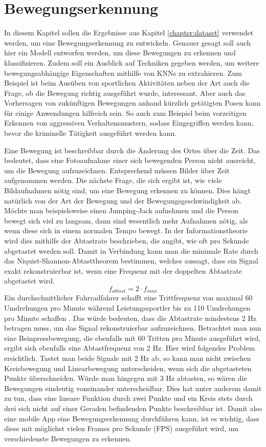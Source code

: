 \chapter{Bewegungserkennung}\label{chapter:motion-detection}
In diesem Kapitel sollen die Ergebnisse aus Kapitel \ref{chapter:dataset}
verwendet werden, um eine Bewegungserkennung zu entwickeln. Genauer gesagt soll
auch hier ein Modell entworfen werden, um diese Bewegungen zu erkennen und
klassifizieren. Zudem soll ein Ausblick auf Techniken gegeben werden, um weitere
bewegungsabhängige Eigenschaften mithilfe von KNNs zu extrahieren. Zum Beispiel
ist beim Ausüben von sportlichen Aktivitäten neben der Art auch die Frage, ob
die Bewegung richtig ausgeführt wurde, interessant. Aber auch das Vorhersagen
von zukünftigen Bewegungen anhand kürzlich getätigten Posen kann für einige
Anwendungen hilfreich sein. So auch zum Beispiel beim vorzeitigen Erkennen von
aggressiven Verhaltensmustern, sodass Eingegriffen werden kann, bevor die
kriminelle Tätigkeit ausgeführt werden kann. 

Eine Bewegung ist beschreibbar durch die Änderung des Ortes über die Zeit. Das
bedeutet, dass eine Fotoaufnahme einer sich bewegenden Person nicht ausreicht,
um die Bewegung aufzuzeichnen. Entsprechend müssen Bilder über Zeit aufgenommen
werden. Die nächste Frage, die sich ergibt ist, wie viele Bildaufnahmen nötig
sind, um eine Bewegung erkennen zu können. Dies hängt natürlich von der Art der
Bewegung und der Bewegungsgeschwindigkeit ab. Möchte man beispielsweise einen
Jumping-Jack aufnehmen und die Person bewegt sich viel zu langsam, dann sind
wesentlich mehr Aufnahmen nötig, als wenn diese sich in einem normalen Tempo
bewegt. In der Informationstheorie wird dies mithilfe der Abtastrate
beschrieben, die angibt, wie oft pro Sekunde abgetastet werden soll. Damit in
Verbindung kann man die minimale Rate durch das Niquist-Shannon-Abtasttheorem
bestimmen, welches aussagt, dass ein Signal exakt rekonstruierbar ist, wenn eine
Frequenz mit der doppelten Abtastrate abgetastet wird.
\[
    f_{abtast} = 2 \cdot f_{max}
\]
Ein durchschnittlicher Fahrradfahrer schafft eine Trittfrequenz von maximal 60
Umdrehungen pro Minute während Leistungssportler bis zu 110 Umdrehungen pro
Minute schaffen \cite{smolik}. Das würde bedeuten, dass die Abtastrate
mindestens 2 Hz betragen muss, um das Signal rekonstruierbar aufzuzeichnen.
Betrachtet man nun eine Beinpressbewegung, die ebenfalls mit 60 Tritten pro
Minute ausgeführt wird, ergibt sich ebenfalls eine Abtastfrequenz von 2 Hz. Hier
wird folgendes Problem ersichtlich. Tastet man beide Signale mit 2 Hz ab, so
kann man nicht zwischen Kreisbewegung und Linearbewegung unterscheiden, wenn
sich die abgetasteten Punkte überschneiden. Würde man hingegen mit 3 Hz
abtasten, so wären die Bewegungen eindeutig voneinander unterscheidbar. Dies hat
unter anderem damit zu tun, dass eine lineare Funktion durch zwei Punkte und ein
Kreis stets durch drei sich nicht auf einer Geraden befindenden Punkte
beschreibbar ist. Damit also eine mobile App eine Bewegungserkennung durchführen
kann, ist es wichtig, dass diese mit möglichst vielen Frames pro Sekunde (FPS)
ausgeführt wird, um verschiedenste Bewegungen zu erkennen.

